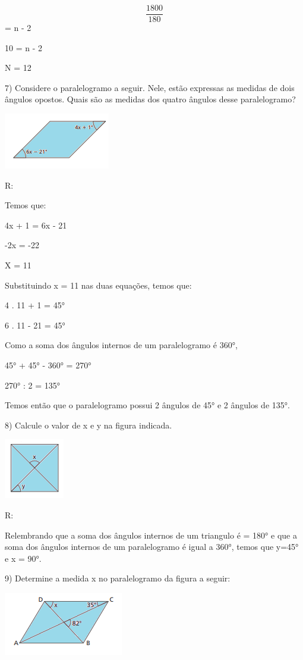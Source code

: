\[\frac{1800}{180}\] = n - 2

10 = n - 2

N = 12

7) Considere o paralelogramo a seguir. Nele, estão expressas as medidas
de dois ângulos opostos. Quais são as medidas dos quatro ângulos desse
paralelogramo?

\includegraphics[width=1.82292in,height=0.95833in]{./imgSAEB_8_MAT/media/image9.png}

R:

Temos que:

4x + 1 = 6x - 21

-2x = -22

X = 11

Substituindo x = 11 nas duas equações, temos que:

4 . 11 + 1 = 45°

6 . 11 - 21 = 45°

Como a soma dos ângulos internos de um paralelogramo é 360°,

45° + 45° - 360° = 270°

270° : 2 = 135°

Temos então que o paralelogramo possui 2 ângulos de 45° e 2 ângulos de
135°.

8) Calcule o valor de x e y na figura indicada.

\includegraphics[width=1.03125in,height=1.03125in]{./imgSAEB_8_MAT/media/image10.png}

R:

Relembrando que a soma dos ângulos internos de um triangulo é = 180° e
que a soma dos ângulos internos de um paralelogramo é igual a 360°,
temos que y=45° e x = 90°.

9) Determine a medida x no paralelogramo da figura a seguir:

\includegraphics[width=2.05208in,height=1.09375in]{./imgSAEB_8_MAT/media/image11.png}

